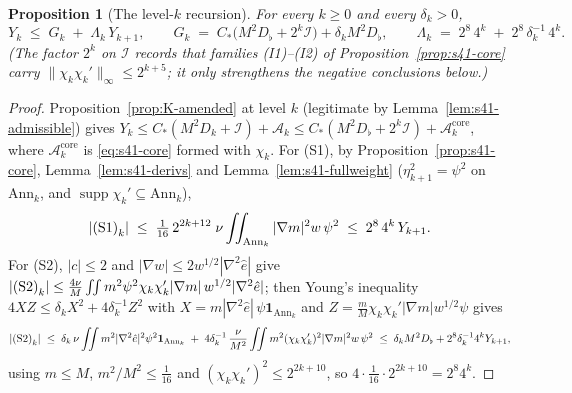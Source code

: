 \documentclass[11pt]{article}
\newtheorem{proposition}[theorem]{Proposition}
\theoremstyle{definition}
\theoremstyle{remark}
\begin{document}
\begin{proposition}[The level-$k$ recursion]\label{prop:s41-recursion}
  For every $k\geq0$ and every $\delta_k>0$,
  \begin{equation}\label{eq:s41-recursion}
    Y_k \;\leq\; G_k \;+\;\Lambda_k\,Y_{k+1},
    \qquad
    G_k \;=\; C_*\bigl(M^2D_\flat+2^{k}\mathcal{I}\bigr)+\delta_k M^2D_\flat,
    \qquad
    \Lambda_k \;=\; 2^{8}\,4^{k}\;+\;2^{8}\,\delta_k^{-1}\,4^{k}.
  \end{equation}
  (The factor $2^{k}$ on $\mathcal{I}$ records that families (I1)--(I2) of
  Proposition~\ref{prop:s41-core} carry $\|\chi_k\chi_k'\|_\infty\leq2^{k+5}$;
  it only strengthens the negative conclusions below.)
\end{proposition}
\begin{proof}
  Proposition~\ref{prop:K-amended} at level $k$
  (legitimate by Lemma~\ref{lem:s41-admissible}) gives
  $Y_k\leq C_*(M^2D_k+\mathcal{I})+\mathcal{A}_k
  \leq C_*(M^2D_\flat+2^{k}\mathcal{I})+\mathcal{A}^{\mathrm{core}}_k$, where
  $\mathcal{A}^{\mathrm{core}}_k$ is \eqref{eq:s41-core} formed with
  $\chi_k$. For (S1), by Proposition~\ref{prop:s41-core},
  Lemma~\ref{lem:s41-derivs} and Lemma~\ref{lem:s41-fullweight}
  ($\eta_{k+1}^2=\psi^2$ on $\mathrm{Ann}_k$, and
  $\operatorname{supp}\chi_k'\subseteq\mathrm{Ann}_k$),
  \[
    |\text{\upshape(S1)}_k|
    \;\leq\;\tfrac{1}{16}\,2^{2k+12}\;
      \nu\iint_{\mathrm{Ann}_k}|\nabla m|^2w\,\psi^2
    \;\leq\; 2^{8}\,4^{k}\,Y_{k+1}.
  \]
  For (S2), $|c|\leq2$ and $|\nabla w|\leq2w^{1/2}|\nabla^2\hat{e}|$ give
  $|\text{\upshape(S2)}_k|\leq\frac{4\nu}{M}\iint m^2\psi^2\chi_k\chi_k'
  |\nabla m|\,w^{1/2}|\nabla^2\hat{e}|$; then Young's inequality
  $4XZ\leq\delta_kX^2+4\delta_k^{-1}Z^2$ with
  $X=m|\nabla^2\hat{e}|\,\psi\mathbf 1_{\mathrm{Ann}_k}$ and
  $Z=\tfrac{m}{M}\chi_k\chi_k'|\nabla m|w^{1/2}\psi$ gives
  \[
    |\text{\upshape(S2)}_k| \;\leq\;
      \delta_k\,\nu\iint m^2|\nabla^2\hat{e}|^2\psi^2
        \mathbf 1_{\mathrm{Ann}_k}
      \;+\;4\delta_k^{-1}\,\frac{\nu}{M^2}
        \iint m^2(\chi_k\chi_k')^2|\nabla m|^2w\,\psi^2
    \;\leq\; \delta_k M^2D_\flat + 2^{8}\delta_k^{-1}4^{k}Y_{k+1},
  \]
  using $m\leq M$, $m^2/M^2\leq\tfrac1{16}$ and
  $(\chi_k\chi_k')^2\leq2^{2k+10}$, so
  $4\cdot\tfrac1{16}\cdot2^{2k+10}=2^{8}4^{k}$.
\end{proof}
\end{document}
